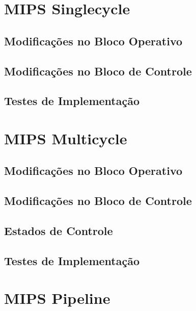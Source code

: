 \documentclass{report}
\let\oldsection\section
\renewcommand\section{\clearpage\oldsection}
\begin{document}
    \renewcommand{\contentsname}{Sumário}
    \tableofcontents
    \clearpage

    \section{MIPS Singlecycle}
        \subsection{Modificações no Bloco Operativo}
        \subsection{Modificações no Bloco de Controle}
        \subsection{Testes de Implementação}

    \section{MIPS Multicycle}
        \subsection{Modificações no Bloco Operativo}
        \subsection{Modificações no Bloco de Controle}
        \subsection{Estados de Controle}
        \subsection{Testes de Implementação}

    \section{MIPS Pipeline}
\end{document}
